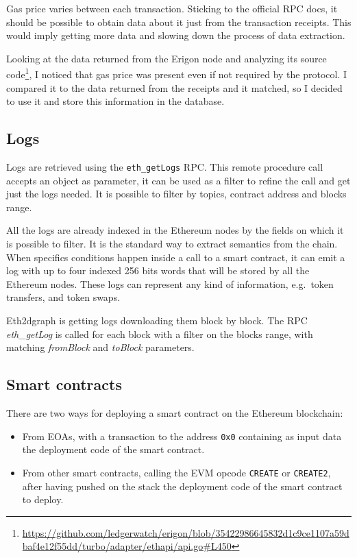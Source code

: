 Gas price varies between each transaction. Sticking to the official RPC docs, it should be possible to obtain data about it just from the transaction receipts. This would imply getting more data and slowing down the process of data extraction.

Looking at the data returned from the Erigon node and analyzing its source code\footnote{\url{https://github.com/ledgerwatch/erigon/blob/35422986645832d1c9ce1107a59dbaf4e12f55dd/turbo/adapter/ethapi/api.go\#L450}}, I noticed that gas price was present even if not required by the protocol. I compared it to the data returned from the receipts and it matched, so I decided to use it and store this information in the database.

\subsection{Logs}

Logs are retrieved using the \texttt{eth\_getLogs} RPC. This remote procedure call accepts an object as parameter, it can be used as a filter to refine the call and get just the logs needed. It is possible to filter by topics, contract address and blocks range. 

All the logs are already indexed in the Ethereum nodes by the fields on which it is possible to filter. It is the standard way to extract semantics from the chain. When specifics conditions happen inside a call to a smart contract, it can emit a log with up to four indexed 256 bits words that will be stored by all the Ethereum nodes. These logs can represent any kind of information, e.g.~token transfers, and token swaps.

Eth2dgraph is getting logs downloading them block by block. The RPC \textit{eth\_getLog} is called for each block with a filter on the blocks range, with matching \textit{fromBlock} and \textit{toBlock} parameters.

\subsection{Smart contracts}

There are two ways for deploying a smart contract on the Ethereum blockchain: 

\begin{itemize}
    \item From EOAs, with a transaction to the address \texttt{0x0} containing as input data the deployment code of the smart contract.
    \item From other smart contracts, calling the EVM opcode \texttt{CREATE} or \texttt{CREATE2}, after having pushed on the stack the deployment code of the smart contract to deploy.
\end{itemize}

